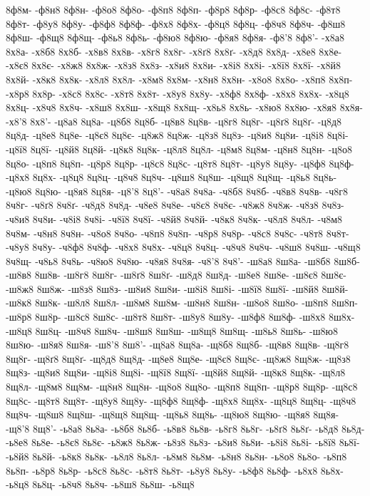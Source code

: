 {8ф8м-
-ф8н8
8ф8н-
-ф8о8
8ф8о-
-ф8п8
8ф8п-
-ф8р8
8ф8р-
-ф8с8
8ф8с-
-ф8т8
8ф8т-
-ф8у8
8ф8у-
-ф8ф8
8ф8ф-
-ф8х8
8ф8х-
-ф8ц8
8ф8ц-
-ф8ч8
8ф8ч-
-ф8ш8
8ф8ш-
-ф8щ8
8ф8щ-
-ф8ь8
8ф8ь-
-ф8ю8
8ф8ю-
-ф8я8
8ф8я-
-ф8'8
8ф8'-
-х8а8
8х8а-
-х8б8
8х8б-
-х8в8
8х8в-
-х8г8
8х8г-
-х8ґ8
8х8ґ-
-х8д8
8х8д-
-х8е8
8х8е-
-х8є8
8х8є-
-х8ж8
8х8ж-
-х8з8
8х8з-
-х8и8
8х8и-
-х8і8
8х8і-
-х8ї8
8х8ї-
-х8й8
8х8й-
-х8к8
8х8к-
-х8л8
8х8л-
-х8м8
8х8м-
-х8н8
8х8н-
-х8о8
8х8о-
-х8п8
8х8п-
-х8р8
8х8р-
-х8с8
8х8с-
-х8т8
8х8т-
-х8у8
8х8у-
-х8ф8
8х8ф-
-х8х8
8х8х-
-х8ц8
8х8ц-
-х8ч8
8х8ч-
-х8ш8
8х8ш-
-х8щ8
8х8щ-
-х8ь8
8х8ь-
-х8ю8
8х8ю-
-х8я8
8х8я-
-х8'8
8х8'-
-ц8а8
8ц8а-
-ц8б8
8ц8б-
-ц8в8
8ц8в-
-ц8г8
8ц8г-
-ц8ґ8
8ц8ґ-
-ц8д8
8ц8д-
-ц8е8
8ц8е-
-ц8є8
8ц8є-
-ц8ж8
8ц8ж-
-ц8з8
8ц8з-
-ц8и8
8ц8и-
-ц8і8
8ц8і-
-ц8ї8
8ц8ї-
-ц8й8
8ц8й-
-ц8к8
8ц8к-
-ц8л8
8ц8л-
-ц8м8
8ц8м-
-ц8н8
8ц8н-
-ц8о8
8ц8о-
-ц8п8
8ц8п-
-ц8р8
8ц8р-
-ц8с8
8ц8с-
-ц8т8
8ц8т-
-ц8у8
8ц8у-
-ц8ф8
8ц8ф-
-ц8х8
8ц8х-
-ц8ц8
8ц8ц-
-ц8ч8
8ц8ч-
-ц8ш8
8ц8ш-
-ц8щ8
8ц8щ-
-ц8ь8
8ц8ь-
-ц8ю8
8ц8ю-
-ц8я8
8ц8я-
-ц8'8
8ц8'-
-ч8а8
8ч8а-
-ч8б8
8ч8б-
-ч8в8
8ч8в-
-ч8г8
8ч8г-
-ч8ґ8
8ч8ґ-
-ч8д8
8ч8д-
-ч8е8
8ч8е-
-ч8є8
8ч8є-
-ч8ж8
8ч8ж-
-ч8з8
8ч8з-
-ч8и8
8ч8и-
-ч8і8
8ч8і-
-ч8ї8
8ч8ї-
-ч8й8
8ч8й-
-ч8к8
8ч8к-
-ч8л8
8ч8л-
-ч8м8
8ч8м-
-ч8н8
8ч8н-
-ч8о8
8ч8о-
-ч8п8
8ч8п-
-ч8р8
8ч8р-
-ч8с8
8ч8с-
-ч8т8
8ч8т-
-ч8у8
8ч8у-
-ч8ф8
8ч8ф-
-ч8х8
8ч8х-
-ч8ц8
8ч8ц-
-ч8ч8
8ч8ч-
-ч8ш8
8ч8ш-
-ч8щ8
8ч8щ-
-ч8ь8
8ч8ь-
-ч8ю8
8ч8ю-
-ч8я8
8ч8я-
-ч8'8
8ч8'-
-ш8а8
8ш8а-
-ш8б8
8ш8б-
-ш8в8
8ш8в-
-ш8г8
8ш8г-
-ш8ґ8
8ш8ґ-
-ш8д8
8ш8д-
-ш8е8
8ш8е-
-ш8є8
8ш8є-
-ш8ж8
8ш8ж-
-ш8з8
8ш8з-
-ш8и8
8ш8и-
-ш8і8
8ш8і-
-ш8ї8
8ш8ї-
-ш8й8
8ш8й-
-ш8к8
8ш8к-
-ш8л8
8ш8л-
-ш8м8
8ш8м-
-ш8н8
8ш8н-
-ш8о8
8ш8о-
-ш8п8
8ш8п-
-ш8р8
8ш8р-
-ш8с8
8ш8с-
-ш8т8
8ш8т-
-ш8у8
8ш8у-
-ш8ф8
8ш8ф-
-ш8х8
8ш8х-
-ш8ц8
8ш8ц-
-ш8ч8
8ш8ч-
-ш8ш8
8ш8ш-
-ш8щ8
8ш8щ-
-ш8ь8
8ш8ь-
-ш8ю8
8ш8ю-
-ш8я8
8ш8я-
-ш8'8
8ш8'-
-щ8а8
8щ8а-
-щ8б8
8щ8б-
-щ8в8
8щ8в-
-щ8г8
8щ8г-
-щ8ґ8
8щ8ґ-
-щ8д8
8щ8д-
-щ8е8
8щ8е-
-щ8є8
8щ8є-
-щ8ж8
8щ8ж-
-щ8з8
8щ8з-
-щ8и8
8щ8и-
-щ8і8
8щ8і-
-щ8ї8
8щ8ї-
-щ8й8
8щ8й-
-щ8к8
8щ8к-
-щ8л8
8щ8л-
-щ8м8
8щ8м-
-щ8н8
8щ8н-
-щ8о8
8щ8о-
-щ8п8
8щ8п-
-щ8р8
8щ8р-
-щ8с8
8щ8с-
-щ8т8
8щ8т-
-щ8у8
8щ8у-
-щ8ф8
8щ8ф-
-щ8х8
8щ8х-
-щ8ц8
8щ8ц-
-щ8ч8
8щ8ч-
-щ8ш8
8щ8ш-
-щ8щ8
8щ8щ-
-щ8ь8
8щ8ь-
-щ8ю8
8щ8ю-
-щ8я8
8щ8я-
-щ8'8
8щ8'-
-ь8а8
8ь8а-
-ь8б8
8ь8б-
-ь8в8
8ь8в-
-ь8г8
8ь8г-
-ь8ґ8
8ь8ґ-
-ь8д8
8ь8д-
-ь8е8
8ь8е-
-ь8є8
8ь8є-
-ь8ж8
8ь8ж-
-ь8з8
8ь8з-
-ь8и8
8ь8и-
-ь8і8
8ь8і-
-ь8ї8
8ь8ї-
-ь8й8
8ь8й-
-ь8к8
8ь8к-
-ь8л8
8ь8л-
-ь8м8
8ь8м-
-ь8н8
8ь8н-
-ь8о8
8ь8о-
-ь8п8
8ь8п-
-ь8р8
8ь8р-
-ь8с8
8ь8с-
-ь8т8
8ь8т-
-ь8у8
8ь8у-
-ь8ф8
8ь8ф-
-ь8х8
8ь8х-
-ь8ц8
8ь8ц-
-ь8ч8
8ь8ч-
-ь8ш8
8ь8ш-
-ь8щ8
}
